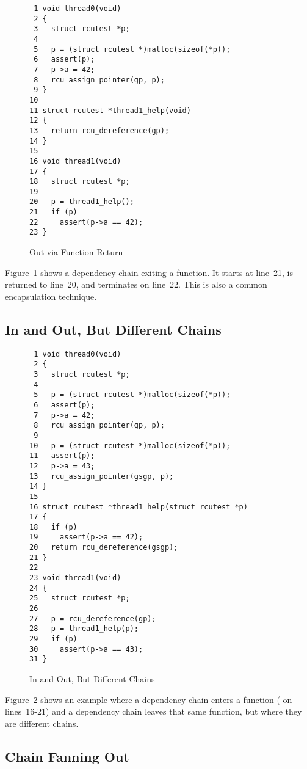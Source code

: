 \documentclass[letterpaper,twocolumn,10pt]{article}
\begin{document}
\begin{figure}[tbp]
{ \scriptsize
\begin{verbatim}
 1 void thread0(void)
 2 {
 3   struct rcutest *p;
 4
 5   p = (struct rcutest *)malloc(sizeof(*p));
 6   assert(p);
 7   p->a = 42;
 8   rcu_assign_pointer(gp, p);
 9 }
10
11 struct rcutest *thread1_help(void)
12 {
13   return rcu_dereference(gp);
14 }
15
16 void thread1(void)
17 {
18   struct rcutest *p;
19
20   p = thread1_help();
21   if (p)
22     assert(p->a == 42);
23 }
\end{verbatim}
}
\caption{Out via Function Return}
\label{fig:Out via Function Return}
\end{figure}

Figure~\ref{fig:Out via Function Return}
shows a dependency chain exiting a function.
It starts at line~21, is returned to line~20, and
terminates on line~22.
This is also a common encapsulation technique.

\subsection{In and Out, But Different Chains}
\label{sec:In and Out, But Different Chains}

\begin{figure}[tbp]
{ \scriptsize
\begin{verbatim}
 1 void thread0(void)
 2 {
 3   struct rcutest *p;
 4
 5   p = (struct rcutest *)malloc(sizeof(*p));
 6   assert(p);
 7   p->a = 42;
 8   rcu_assign_pointer(gp, p);
 9
10   p = (struct rcutest *)malloc(sizeof(*p));
11   assert(p);
12   p->a = 43;
13   rcu_assign_pointer(gsgp, p);
14 }
15
16 struct rcutest *thread1_help(struct rcutest *p)
17 {
18   if (p)
19     assert(p->a == 42);
20   return rcu_dereference(gsgp);
21 }
22
23 void thread1(void)
24 {
25   struct rcutest *p;
26
27   p = rcu_dereference(gp);
28   p = thread1_help(p);
29   if (p)
30     assert(p->a == 43);
31 }
\end{verbatim}
}
\caption{In and Out, But Different Chains}
\label{fig:In and Out, But Different Chains}
\end{figure}

Figure~\ref{fig:In and Out, But Different Chains}
shows an example where a dependency chain enters a function
( on lines~16-21)
and a dependency chain leaves that same function,
but where they are different chains.

\subsection{Chain Fanning Out}
\label{sec:Chain Fanning Out}
\end{document}
